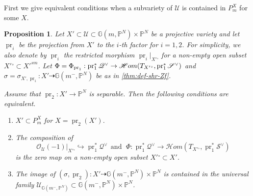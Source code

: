 \documentclass[a4paper,12pt]{amsart}
\theoremstyle{plain}
\newtheorem{prop}[prop]{Proposition}
\theoremstyle{definition}
\begin{document}
First we give equivalent conditions when a subvariety of ${\mathcal {U}}$
is contained in $P_m^X$ for some $X$.

\begin{prop}\label{thm_chara_Pmx}
  Let $X' \subset {\mathcal {U}} \subset {\mathbb {G}}(m,{\mathbb{P}}^N) \times {\mathbb{P}}^N$ be a projective variety and let $\operatorname{pr}_i$ be the projection from $X'$ to the $i$-th factor for $i=1,2$.
  For simplicity,
  we also denote by $\operatorname{pr}_i$ the restricted morphism $\operatorname{pr}_i|_{{{X'}{^\circ}}}$
  for a non-empty open subset ${{{X'}{^\circ}}} \subset {X'}^{sm}$.
  Let $\Phi = \Phi_{\operatorname{pr}_1}: \operatorname{pr}_1^*{\mathscr{Q}}\spcheck \rightarrow {\mathscr{H}om}(T_{{{X'}{^\circ}}}, \operatorname{pr}_1^*{\mathscr{S}}\spcheck)$ and $\sigma = \sigma_{X', \operatorname{pr}_1}: X' \dashrightarrow {\mathbb{G}}(m^{-}, {{\mathbb{P}}^N})$ be as in \autoref{thm:def-shr-Zf}.
  
  Assume that $\operatorname{pr}_2 : X' {\rightarrow} {\mathbb{P}}^N$ is separable.   Then the following conditions are equivalent.
  \begin{enumerate}[\normalfont(i)]
  \item\label{thm:GaussImage:graph}  $X' \subset P_m^{X}$ for $X=\operatorname{pr}_2(X')$.   \item\label{thm:GaussImage:zero} The composition of 
    \[
    {\mathscr{O}}_{\mathcal {U}}(-1) |_{{X'}{^\circ}} \hookrightarrow \operatorname{pr}_1^* {\mathscr{Q}}^{\vee}
    \ \ \text{and}\ \ \,
    \Phi : \operatorname{pr}_1^* {\mathscr{Q}}^{\vee} {\rightarrow} {\mathscr{H}om}(T_{{X'}{^\circ}}, \operatorname{pr}_1^* {\mathscr{S}}^{\vee})
    \]
    is the zero map on a non-empty open subset ${X'}{^\circ} \subset X'$.
  \item\label{thm:GaussImage:shr} The image of $(\sigma, \operatorname{pr}_2) : X' \dashrightarrow {\mathbb{G}}(m^{-}, {{\mathbb{P}}^N}) \times {{\mathbb{P}}^N}$
    is contained in 
    the universal family ${\mathcal{U}}_{{\mathbb{G}}(m^{-}, {{\mathbb{P}}^N})} \subset {\mathbb{G}}(m^{-}, {{\mathbb{P}}^N}) \times {{\mathbb{P}}^N}$.
  \end{enumerate}
\end{prop}
\end{document}
